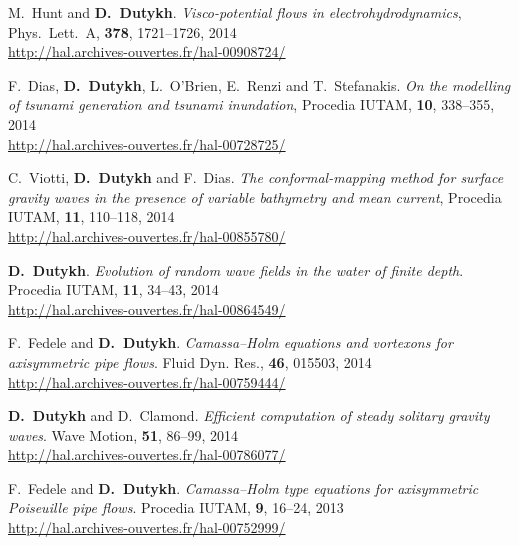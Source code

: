 \begin{etaremune}
  \item M.~Hunt and \textbf{D.~Dutykh}. \textit{Visco-potential flows in electrohydrodynamics}, Phys.~Lett.~A, \textbf{378}, 1721--1726, 2014 \\ %
  \url{http://hal.archives-ouvertes.fr/hal-00908724/}
  
  \item F.~Dias, \textbf{D.~Dutykh}, L.~O'Brien, E.~Renzi and T.~Stefanakis. \textit{On the modelling of tsunami generation and tsunami inundation}, Procedia IUTAM, \textbf{10}, 338--355, 2014 \\ %
  \url{http://hal.archives-ouvertes.fr/hal-00728725/}
  
  \item C.~Viotti, \textbf{D.~Dutykh} and F.~Dias. \textit{The conformal-mapping method for surface gravity waves in the presence of variable bathymetry and mean current}, Procedia IUTAM, \textbf{11}, 110--118, 2014 \\ %
  \url{http://hal.archives-ouvertes.fr/hal-00855780/}
  
  \item \textbf{D.~Dutykh}. \textit{Evolution of random wave fields in the water of finite depth}. Procedia IUTAM, \textbf{11}, 34--43, 2014 \\ %
  \url{http://hal.archives-ouvertes.fr/hal-00864549/}
  
  \item F.~Fedele and \textbf{D.~Dutykh}. \textit{Camassa--Holm equations and vortexons for axisymmetric pipe flows}. Fluid Dyn. Res., \textbf{46}, 015503, 2014 \\ %
  \url{http://hal.archives-ouvertes.fr/hal-00759444/}

  \item \textbf{D.~Dutykh} and D.~Clamond. \textit{Efficient computation of steady solitary gravity waves}. Wave Motion, \textbf{51}, 86--99, 2014 \\ %
  \url{http://hal.archives-ouvertes.fr/hal-00786077/}


  \item F.~Fedele and \textbf{D.~Dutykh}. \textit{Camassa--Holm type equations for axisymmetric Poiseuille pipe flows}. Procedia IUTAM, \textbf{9}, 16--24, 2013 \\ %
  \url{http://hal.archives-ouvertes.fr/hal-00752999/}


\end{etaremune}
